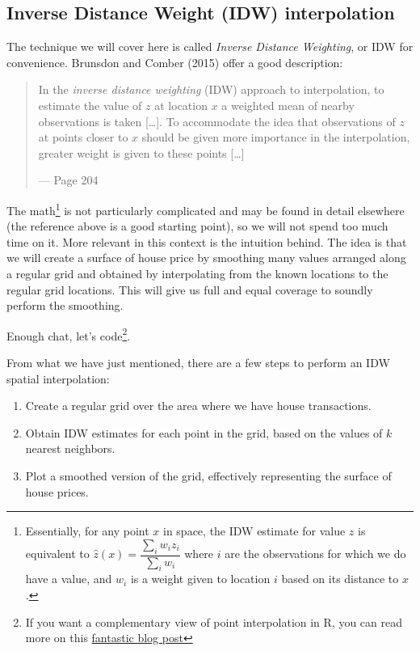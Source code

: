 \documentclass[
  letterpaper,
  DIV=11,
  numbers=noendperiod,
  oneside]{scrreprt}
\providecommand{\tightlist}{%
  \setlength{\itemsep}{0pt}\setlength{\parskip}{0pt}}\usepackage{longtable,booktabs,array}
\begin{document}
\subsection{Inverse Distance Weight (IDW)
interpolation}\label{inverse-distance-weight-idw-interpolation}

The technique we will cover here is called \emph{Inverse Distance
Weighting}, or IDW for convenience. Brunsdon and Comber (2015) offer a
good description:

\begin{quote}
In the \emph{inverse distance weighting} (IDW) approach to
interpolation, to estimate the value of \(z\) at location \(x\) a
weighted mean of nearby observations is taken {[}\ldots{]}. To
accommodate the idea that observations of \(z\) at points closer to
\(x\) should be given more importance in the interpolation, greater
weight is given to these points {[}\ldots{]}

--- Page 204
\end{quote}

The math\footnote{Essentially, for any point \(x\) in space, the IDW
  estimate for value \(z\) is equivalent to
  \(\hat{z} (x) = \dfrac{\sum_i w_i z_i}{\sum_i w_i}\) where \(i\) are
  the observations for which we do have a value, and \(w_i\) is a weight
  given to location \(i\) based on its distance to \(x\).} is not
particularly complicated and may be found in detail elsewhere (the
reference above is a good starting point), so we will not spend too much
time on it. More relevant in this context is the intuition behind. The
idea is that we will create a surface of house price by smoothing many
values arranged along a regular grid and obtained by interpolating from
the known locations to the regular grid locations. This will give us
full and equal coverage to soundly perform the smoothing.

Enough chat, let's code\footnote{If you want a complementary view of
  point interpolation in R, you can read more on this
  \href{https://swilke-geoscience.net/post/2020-09-10-kriging_with_r/kriging/}{fantastic
  blog post}}.

From what we have just mentioned, there are a few steps to perform an
IDW spatial interpolation:

\begin{enumerate}
\def\labelenumi{\arabic{enumi}.}
\tightlist
\item
  Create a regular grid over the area where we have house transactions.
\item
  Obtain IDW estimates for each point in the grid, based on the values
  of \(k\) nearest neighbors.
\item
  Plot a smoothed version of the grid, effectively representing the
  surface of house prices.
\end{enumerate}
\end{document}
